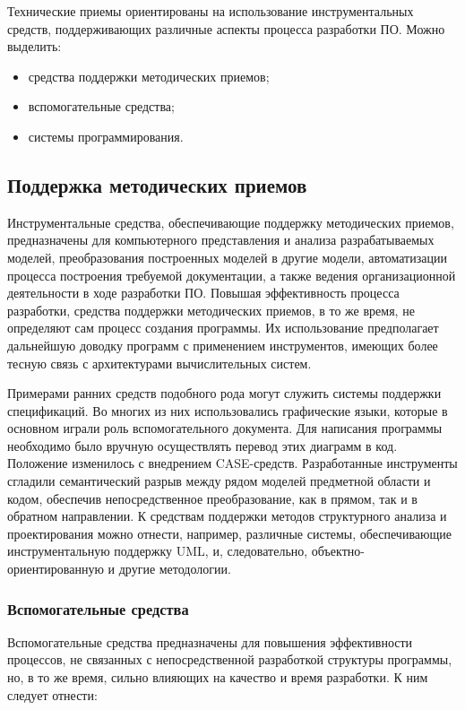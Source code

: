 Технические приемы ориентированы на использование инструментальных средств, поддерживающих различные аспекты процесса разработки ПО. Можно выделить:

\begin{itemize}
    \item средства поддержки методических приемов;
    \item вспомогательные средства;
    \item системы программирования.
\end{itemize}

\subsection*{Поддержка методических приемов}

Инструментальные средства, обеспечивающие поддержку методических приемов, предназначены для компьютерного представления и анализа разрабатываемых моделей, преобразования построенных моделей в другие модели, автоматизации процесса построения требуемой документации, а также ведения организационной деятельности в ходе разработки ПО. Повышая эффективность процесса разработки, средства поддержки методических приемов, в то же время, не определяют сам процесс создания программы. Их использование предполагает дальнейшую доводку программ с применением инструментов, имеющих более тесную связь с архитектурами вычислительных систем.

Примерами ранних средств подобного рода могут служить системы поддержки спецификаций. Во многих из них использовались графические языки, которые в основном играли роль вспомогательного документа. Для написания программы необходимо было вручную осуществлять перевод этих диаграмм в код. Положение изменилось с внедрением CASE-средств. Разработанные инструменты сгладили семантический разрыв между рядом моделей предметной области и кодом, обеспечив непосредственное преобразование, как в прямом, так и в обратном направлении. К средствам поддержки методов структурного анализа и проектирования можно отнести, например, различные системы, обеспечивающие инструментальную поддержку UML, и, следовательно, объектно-ориентированную и другие методологии.

\subsubsection{Вспомогательные средства}

Вспомогательные средства предназначены для повышения эффективности процессов, не связанных с непосредственной разработкой структуры программы, но, в то же время, сильно влияющих на качество и время разработки. К ним следует отнести:

